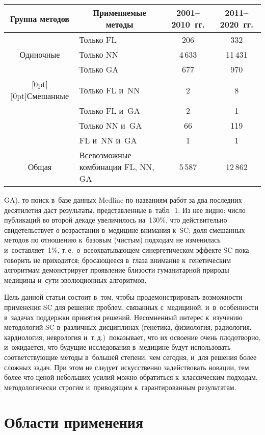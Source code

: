 \begin{multicols}{2}
\begin{table*}
\begin{center}
\tabcolsep=9pt
\begin{tabular}{|c|l|c|c|}
\hline
Группа методов&\multicolumn{1}{c|}{Применяемые методы}&2001--2010~гг.&2011--2020~гг.\\
\hline
 &Только FL&206&332\\
Одиночные&Только NN&4\,633\hphantom{9\,}&11\,431\hphantom{9\,9}\\
&Только GA&677&970\\
\hline
\raisebox{-18pt}[0pt][0pt]{Смешанные}&Только FL и~NN&\hphantom{99}2&\hphantom{99}8\\
&Только FL и~GA&\hphantom{99}2&\hphantom{99}1\\
&Только NN и~GA&\hphantom{9}66&119\\
&FL и~NN и~GA&\hphantom{99}1&\hphantom{99}1\\
\hline
Общая&Всевозможные комбинации FL, NN, GA&5\,587\hphantom{9\,}&12\,862\hphantom{9\,9}\\
\hline
\end{tabular}
\end{center}
\end{table*}
  GA), то поиск в~базе данных 
Medline по названиям работ за два последних десятилетия даст результаты, 
представленные в~табл.~1. Из нее видно: число публикаций во второй декаде 
увеличилось на~130\%, что действительно свидетельствует о возрастании 
в~медицине внимания к~SC; доля смешанных методов по отношению к~базовым 
(чистым) подходам не изменилась и~составляет~1\%, т.\,е.\ о~всеохватывающем 
синергетическом эффекте SC пока говорить не приходится; бросающееся 
в~глаза внимание к~генетическим алгоритмам демонстрирует проявление 
близости гуманитарной природы медицины и~сути эволюционных алгоритмов.
     

     Цель данной статьи состоит в~том, чтобы продемонстрировать 
возможности применения SC для решения проблем, связанных с~медициной, 
и~в~особенности в~задачах поддержки принятия решений. Несомненный интерес 
к~изучению методологий SC в~различных дисциплинах (генетика, физиология, 
радиология, кардиология, неврология и~т.\,д.)\ показывает, что их освоение 
очень плодотворно, и~ожидается, что будущие исследования в~медицине будут 
использовать соответствующие методы в~большей степени, чем сегодня, и~для 
решения более сложных задач. При этом не следует искусственно 
задействовать новации, тем более что ценой небольших усилий можно 
обратиться к~классическим подходам, методологически строгим и~приводящим к~гарантированным результатам.
     
\section{Области применения}


\end{multicols}
